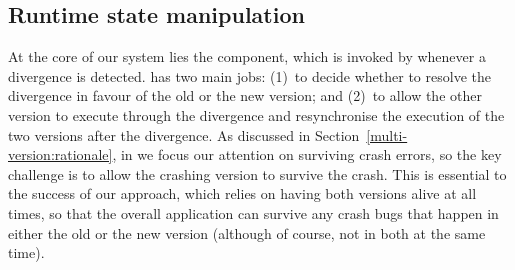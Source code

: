
\subsection{Runtime state manipulation}
\label{sec:rem}

At the core of our system lies the \rem component, which is invoked
by \mxm whenever a divergence is detected.  \rem has two main jobs:
(1)~to decide whether to resolve the divergence in favour of the old or
the new version; and (2)~to allow the other version to execute through
the divergence and resynchronise the execution of the two versions
after the divergence.
As discussed in Section~\ref{multi-version:rationale}, in \mx we focus
our attention on surviving crash errors, so the key challenge is to
allow the crashing version to survive the crash.  This is essential to
the success of our approach, which relies on having both versions alive
at all times, so that the overall application can survive any crash bugs
that happen in either the old or the new version (although of course,
not in both at the same time).

